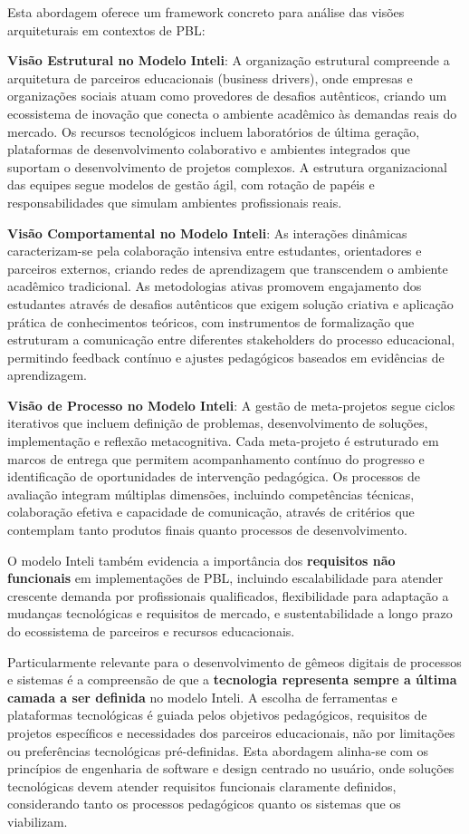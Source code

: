 \documentclass[12pt,a4paper]{article}
\begin{document}
Esta abordagem oferece um framework concreto para análise das visões arquiteturais em contextos de PBL:

\textbf{Visão Estrutural no Modelo Inteli}: A organização estrutural compreende a arquitetura de parceiros educacionais (business drivers), onde empresas e organizações sociais atuam como provedores de desafios autênticos, criando um ecossistema de inovação que conecta o ambiente acadêmico às demandas reais do mercado. Os recursos tecnológicos incluem laboratórios de última geração, plataformas de desenvolvimento colaborativo e ambientes integrados que suportam o desenvolvimento de projetos complexos. A estrutura organizacional das equipes segue modelos de gestão ágil, com rotação de papéis e responsabilidades que simulam ambientes profissionais reais.

\textbf{Visão Comportamental no Modelo Inteli}: As interações dinâmicas caracterizam-se pela colaboração intensiva entre estudantes, orientadores e parceiros externos, criando redes de aprendizagem que transcendem o ambiente acadêmico tradicional. As metodologias ativas promovem engajamento dos estudantes através de desafios autênticos que exigem solução criativa e aplicação prática de conhecimentos teóricos, com instrumentos de formalização que estruturam a comunicação entre diferentes stakeholders do processo educacional, permitindo feedback contínuo e ajustes pedagógicos baseados em evidências de aprendizagem.

\textbf{Visão de Processo no Modelo Inteli}: A gestão de meta-projetos segue ciclos iterativos que incluem definição de problemas, desenvolvimento de soluções, implementação e reflexão metacognitiva. Cada meta-projeto é estruturado em marcos de entrega que permitem acompanhamento contínuo do progresso e identificação de oportunidades de intervenção pedagógica. Os processos de avaliação integram múltiplas dimensões, incluindo competências técnicas, colaboração efetiva e capacidade de comunicação, através de critérios que contemplam tanto produtos finais quanto processos de desenvolvimento.

O modelo Inteli também evidencia a importância dos \textbf{requisitos não funcionais} em implementações de PBL, incluindo escalabilidade para atender crescente demanda por profissionais qualificados, flexibilidade para adaptação a mudanças tecnológicas e requisitos de mercado, e sustentabilidade a longo prazo do ecossistema de parceiros e recursos educacionais.

Particularmente relevante para o desenvolvimento de gêmeos digitais de processos e sistemas é a compreensão de que a \textbf{tecnologia representa sempre a última camada a ser definida} no modelo Inteli. A escolha de ferramentas e plataformas tecnológicas é guiada pelos objetivos pedagógicos, requisitos de projetos específicos e necessidades dos parceiros educacionais, não por limitações ou preferências tecnológicas pré-definidas. Esta abordagem alinha-se com os princípios de engenharia de software e design centrado no usuário, onde soluções tecnológicas devem atender requisitos funcionais claramente definidos, considerando tanto os processos pedagógicos quanto os sistemas que os viabilizam.
\end{document}
